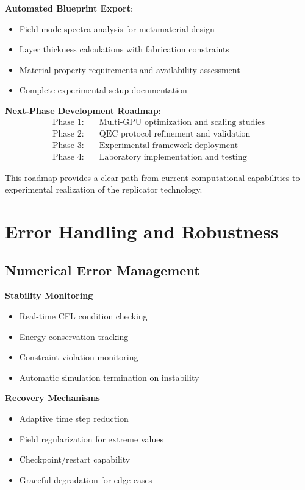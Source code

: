 \documentclass[11pt]{article}
\begin{document}
\textbf{Automated Blueprint Export}:
\begin{itemize}
\item Field-mode spectra analysis for metamaterial design
\item Layer thickness calculations with fabrication constraints
\item Material property requirements and availability assessment
\item Complete experimental setup documentation
\end{itemize}

\textbf{Next-Phase Development Roadmap}:
\begin{align}
\text{Phase 1:} &\quad \text{Multi-GPU optimization and scaling studies} \\
\text{Phase 2:} &\quad \text{QEC protocol refinement and validation} \\
\text{Phase 3:} &\quad \text{Experimental framework deployment} \\
\text{Phase 4:} &\quad \text{Laboratory implementation and testing}
\end{align}

This roadmap provides a clear path from current computational capabilities to experimental realization of the replicator technology.

\section{Error Handling and Robustness}

\subsection{Numerical Error Management}

\textbf{Stability Monitoring}
\begin{itemize}
\item Real-time CFL condition checking
\item Energy conservation tracking
\item Constraint violation monitoring
\item Automatic simulation termination on instability
\end{itemize}

\textbf{Recovery Mechanisms}
\begin{itemize}
\item Adaptive time step reduction
\item Field regularization for extreme values
\item Checkpoint/restart capability
\item Graceful degradation for edge cases
\end{itemize}
\end{document}
